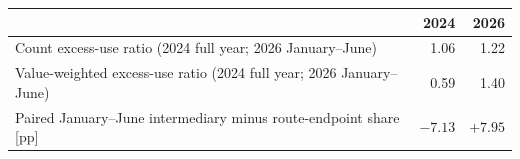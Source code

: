 \begin{tabularx}{\linewidth}{@{}>{\raggedright\arraybackslash}Xrr@{}}
\toprule
 & 2024 & 2026 \\
\midrule
Count excess-use ratio (2024 full year; 2026 January--June) & 1.06 & 1.22 \\
Value-weighted excess-use ratio (2024 full year; 2026 January--June) & 0.59 & 1.40 \\
Paired January--June intermediary minus route-endpoint share [pp] & $-7.13$ & $+7.95$ \\
\bottomrule
\end{tabularx}
